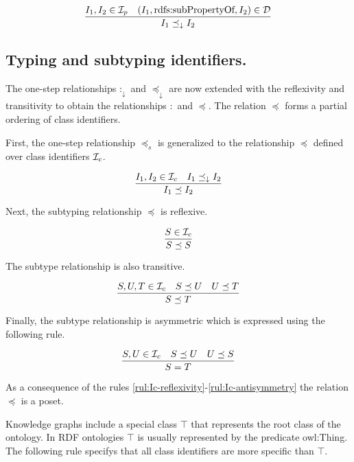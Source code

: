 \documentclass[runningheads]{llncs}
\newcommand{\darr}{\downarrow}
\newcommand{\D}{{\cal D}}
\newcommand{\Ic}{{\cal I}_c}
\newcommand{\Ip}{{\cal I}_p}
\newcommand{\nl}{\hfill\break}
\begin{document}
\begin{equation}
\dfrac{I_1,I_2\in\Ip \quad (I_1,\text{rdfs:subPropertyOf},I_2)\in \D}
      {I_1\preceq_\darr\/I_2}
\end{equation}




\subsection{Typing and subtyping identifiers.}\nl

The one-step relationships $:_\darr$ and $\preceq_\darr$ are now
extended with the reflexivity and transitivity to obtain the
relationships $:$ and $\preceq$. The relation $\preceq$ forms a
partial ordering of class
identifiers. %

First, the one-step relationship $\preceq_s$ is generalized to the
relationship $\preceq$ defined over class identifiers $\Ic$.

\begin{equation}
\label{rul:Ic-extended}
\dfrac{I_1,I_2\in\Ic \quad I_1\preceq_\darr I_2}
      {I_1 \preceq I_2}
\end{equation}

Next, the subtyping relationship $\preceq$ is reflexive.

\begin{equation}
\label{rul:Ic-reflexivity}
\dfrac{S\in \Ic}
      {S\preceq\/S}
\end{equation}

The subtype relationship is also transitive. 

\begin{equation}
\label{rul:Ic-transitivity}
\dfrac{S,U,T\in\Ic \quad S\preceq\/U \quad U\preceq\/T}
      {S\preceq\/T}   
\end{equation}

Finally, the subtype relationship is asymmetric which is expressed
using the following rule. 

\begin{equation}
\label{rul:Ic-antisymmetry}
\dfrac{S,U\in\Ic \quad S\preceq\/U \quad U\preceq\/S}
      {S=T}   
\end{equation}

As a consequence of the rules
\ref{rul:Ic-reflexivity}-\ref{rul:Ic-antisymmetry} the relation
$\preceq$ is a poset.

Knowledge graphs include a special class $\top$ that represents the
root class of the ontology. In RDF ontologies $\top$ is usually
represented by the predicate owl:Thing. The following rule specifys
that all class identifiers are more specific than $\top$.
\end{document}
